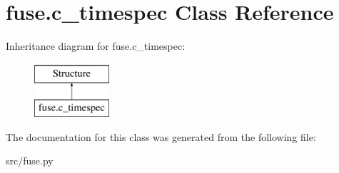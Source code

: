 \hypertarget{classfuse_1_1c__timespec}{\section{fuse.\-c\-\_\-timespec Class Reference}
\label{classfuse_1_1c__timespec}
}
Inheritance diagram for fuse.\-c\-\_\-timespec\-:\begin{figure}[H]
\begin{center}
\leavevmode
\includegraphics[height=2.000000cm]{classfuse_1_1c__timespec}
\end{center}
\end{figure}


The documentation for this class was generated from the following file\-:\begin{DoxyCompactItemize}
\item 
src/fuse.\-py\end{DoxyCompactItemize}

